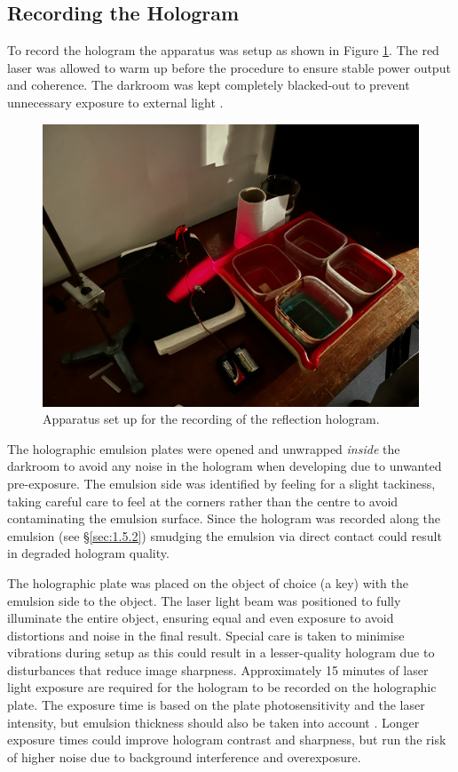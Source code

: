 \documentclass[12pt]{article}
\begin{document}
\subsection{Recording the Hologram}

To record the hologram the apparatus was setup as shown in Figure \ref{fig:11}. The red laser was allowed to warm up before the procedure to ensure stable power output and coherence. The darkroom was kept completely blacked-out to prevent unnecessary exposure to external light \cite{UCDholo}.

\begin{figure}[H]
    \centering
    \includegraphics[width=.65\linewidth]{holo setup.jpeg}
    \caption{\centering Apparatus set up for the recording of the reflection hologram.}
    \label{fig:11}
\end{figure}

The holographic emulsion plates were opened and unwrapped \textit{inside} the darkroom to avoid any noise in the hologram when developing due to unwanted pre-exposure.
The emulsion side was identified by feeling for a slight tackiness, taking careful care to feel at the corners rather than the centre to avoid contaminating the emulsion surface. Since the hologram was recorded along the emulsion (see §\ref{sec:1.5.2}) smudging the emulsion via direct contact could result in degraded hologram quality.

The holographic plate was placed on the object of choice (a key) with the emulsion side to the object. The laser light beam was positioned to fully illuminate the entire object, ensuring equal and even exposure to avoid distortions and noise in the final result.
Special care is taken to minimise vibrations during setup as this could result in a lesser-quality hologram due to disturbances that reduce image sharpness.
Approximately 15 minutes of laser light exposure are required for the hologram to be recorded on the holographic plate. The exposure time is based on the plate photosensitivity and the laser intensity, but emulsion thickness should also be taken into account \cite{UCDholo}.
Longer exposure times could improve hologram contrast and sharpness, but run the risk of higher noise due to background interference and overexposure.
\end{document}
